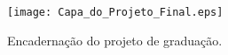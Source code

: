 \begin{figure}
\begin{center}
\parbox[htb]{13.0cm}
  {
  \begin{center}
  \texttt{[image: Capa\_do\_Projeto\_Final.eps]}
  \caption[\small{Encadernação do projeto de graduação.}]{\label{FigPFC} \small{Encadernação do projeto de graduação.}}
  \end{center}
  }
\end{center}
\end{figure}